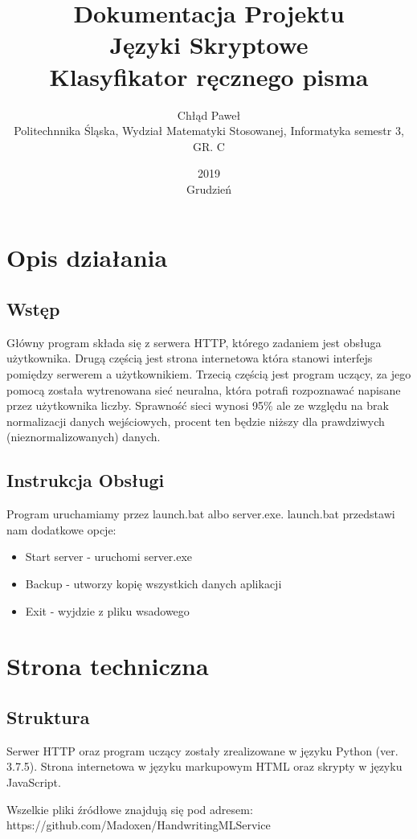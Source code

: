 \documentclass{article}
\title{Dokumentacja Projektu \\ Języki Skryptowe \\ Klasyfikator ręcznego pisma}
\author{Chłąd Paweł \\ Politechnnika Śląska, Wydział Matematyki Stosowanej, Informatyka semestr 3, GR. C}
\date{2019 \\ Grudzień}
\begin{document}
\maketitle
\pagebreak
\section{Opis działania}

\subsection{Wstęp}
Główny program składa się z serwera HTTP, którego
zadaniem jest obsługa użytkownika. Drugą częścią jest 
strona internetowa która stanowi interfejs pomiędzy serwerem
a użytkownikiem. Trzecią częścią jest program uczący, za jego
pomocą została wytrenowana sieć neuralna, która potrafi rozpoznawać
napisane przez użytkownika liczby. Sprawność sieci wynosi 95\% ale 
ze względu na brak normalizacji danych wejściowych, procent ten będzie niższy
dla prawdziwych (nieznormalizowanych) danych. 

\subsection{Instrukcja Obsługi}

Program uruchamiamy przez launch.bat albo server.exe. launch.bat przedstawi nam dodatkowe opcje:
\begin{itemize}
    \item Start server - uruchomi server.exe
    \item Backup - utworzy kopię wszystkich danych aplikacji
    \item Exit - wyjdzie z pliku wsadowego
\end{itemize}




\section{Strona techniczna}
\subsection{Struktura}
Serwer HTTP oraz program uczący zostały zrealizowane w języku Python (ver. 3.7.5).
Strona internetowa w języku markupowym HTML oraz skrypty w języku JavaScript.

Wszelkie pliki źródłowe znajdują się pod adresem: https://github.com/Madoxen/HandwritingMLService
\end{document}
